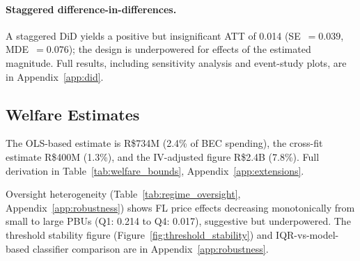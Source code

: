 \paragraph{Staggered difference-in-differences.}
A \citet{callaway2021difference} staggered DiD yields a positive but
insignificant ATT of 0.014 (SE~$= 0.039$, MDE~$= 0.076$); the design
is underpowered for effects of the estimated magnitude. Full results,
including \citet{rambachan2023more} sensitivity analysis and
event-study plots, are in Appendix~\ref{app:did}.


\subsection{Welfare Estimates}
\label{sec:welfare}

The OLS-based estimate is R\$734M (2.4\% of BEC spending), the cross-fit estimate R\$400M (1.3\%), and the IV-adjusted figure R\$2.4B (7.8\%). Full derivation in Table~\ref{tab:welfare_bounds}, Appendix~\ref{app:extensions}.


Oversight heterogeneity (Table~\ref{tab:regime_oversight}, Appendix~\ref{app:robustness}) shows FL price effects decreasing monotonically from small to large PBUs (Q1: 0.214 to Q4: 0.017), suggestive but underpowered. The threshold stability figure (Figure~\ref{fig:threshold_stability}) and IQR-vs-model-based classifier comparison are in Appendix~\ref{app:robustness}.
